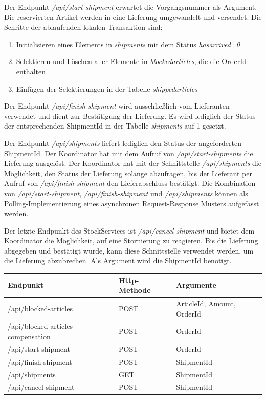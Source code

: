 Der Endpunkt \textit{/api/start-shipment} erwartet die Vorgangsnummer als Argument. Die reservierten Artikel werden in eine Lieferung umgewandelt und versendet. Die Schritte der ablaufenden lokalen Transaktion sind:
\begin{enumerate}
	\item Initialisieren eines Elements in \textit{shipments} mit dem Status \textit{hasarrived=0}
	\item Selektieren und Löschen aller Elemente in \textit{blockedarticles}, die die OrderId enthalten
	\item Einfügen der Selektierungen in der Tabelle \textit{shippedarticles}
\end{enumerate}

Der Endpunkt \textit{/api/finish-shipment} wird ausschließlich vom Lieferanten verwendet und dient zur Bestätigung der Lieferung. Es wird lediglich der Status der entsprechenden ShipmentId in der Tabelle \textit{shipments} auf 1 gesetzt.

Der Endpunkt \textit{/api/shipments} liefert lediglich den Status der angeforderten ShipmentId. Der Koordinator hat mit dem Aufruf von \textit{/api/start-shipments} die Lieferung ausgelöst. Der Koordinator hat mit der Schnittstelle \textit{/api/shipments} die Möglichkeit, den Status der Lieferung solange abzufragen, bis der Lieferant per Aufruf von \textit{/api/finish-shipment} den Lieferabschluss bestätigt. Die Kombination von \textit{/api/start-shipment}, \textit{/api/finish-shipment} und \textit{/api/shipments} können als Polling-Implementierung eines asynchronen Request-Response Musters aufgefasst werden. 

Der letzte Endpunkt des StockServices ist \textit{/api/cancel-shipment} und bietet dem Koordinator die Möglichkeit, auf eine Stornierung zu reagieren. Bis die Lieferung abgegeben und bestätigt wurde, kann diese Schnittstelle verwendet werden, um die Lieferung abzubrechen. Als Argument wird die ShipmentId benötigt.

\begin{center}
	\begin{tabular}[h]{|p{6.5cm}|p{3cm}|p{5.1cm}|}
		\hline
		Endpunkt & Http-Methode & Argumente \\ \hline
		/api/blocked-articles & POST & ArticleId, Amount, OrderId\\ \hline
		/api/blocked-articles-compensation & POST & OrderId \\ \hline
		/api/start-shipment & POST & OrderId \\ \hline
		/api/finish-shipment & POST & ShipmentId \\ \hline
		/api/shipments & GET & ShipmentId \\ \hline
		/api/cancel-shipment & POST & ShipmentId \\ \hline
	\end{tabular}
\end{center}
\FloatBarrier

